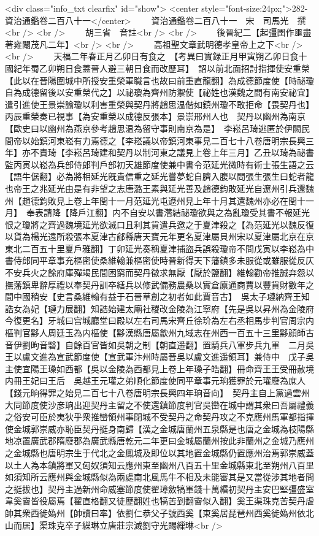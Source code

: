<div class="info_txt clearfix" id="show">
<center style="font-size:24px;">282-資治通鑑卷二百八十一</center>
  　　資治通鑑卷二百八十一　宋　司馬光　撰<br />
<br />
　　胡三省　音註<br />
<br />
　　後晉紀二【起彊圉作噩盡著雍閹茂凡二年】<br />
<br />
　　高祖聖文章武明德孝皇帝上之下<br />
<br />
　　天福二年春正月乙卯日有食之　【考異曰實録正月甲寅朔乙卯日食十國紀年蜀乙卯朔日食蓋晉人避三朝日食而改歷耳】　詔以前北面招討指揮使安重榮【此以在晉陽圍城中所授安重榮軍職言也故曰前重直龍翻】為成德節度使【時祕瓊自為成德留後以安重榮代之】以祕瓊為齊州防禦使【祕姓也漢魏之間有南安祕宜】遣引進使王景崇諭瓊以利害重榮與契丹將趙思温偕如鎮州瓊不敢拒命【畏契丹也】丙辰重榮奏已視事【為安重榮以成德反張本】景崇邢州人也　契丹以幽州為南京【歐史曰以幽州為燕京參考趙思温為留守事則南京為是】　李崧呂琦逃匿於伊闕民間帝以始鎮河東崧有力焉德之【李崧議以帝鎮河東事見二百七十八卷唐明宗長興三年】亦不責琦【李崧呂琦建和契丹以制河東之議見上卷上年三月】乙丑以琦為祕書監丙寅以崧為兵部侍郎判戶部初天雄節度使兼中書令范延光微時有術士張生語之云【語牛倨翻】必為將相延光旣貴信重之延光嘗夢蛇自臍入腹以問張生張生曰蛇者龍也帝王之兆延光由是有非望之志唐潞王素與延光善及趙德鈞敗延光自遼州引兵還魏州【趙德鈞敗見上卷上年閏十一月范延光屯遼州見上年十月其還魏州亦必在閏十一月】　奉表請降【降戶江翻】内不自安以書濳結祕瓊欲與之為亂瓊受其書不報延光恨之瓊將之齊過魏境延光欲滅口且利其貨遣兵邀之于夏津殺之【為范延光以魏反復以貨為楊光遠所殺張本夏津古鄃縣唐天寶元年更名夏津屬貝州宋以夏津屬北京在京東北二百五十里夏戶雅翻】丁卯延光奏稱夏津捕盜兵誤殺瓊帝不問戊寅以李崧為中書侍郎同平章事充樞密使桑維翰兼樞密使時晉新得天下藩鎮多未服從或雖服從反仄不安兵火之餘府庫殫竭民間困窮而契丹徵求無厭【厭於鹽翻】維翰勸帝推誠弃怨以撫藩鎮卑辭厚禮以奉契丹訓卒繕兵以修武備務農桑以實倉廪通商賈以豐貨財數年之間中國稍安【史言桑維翰有益于石晉草創之初者如此賈音古】　吳太子璉納齊王知誥女為妃【璉力展翻】知誥始建太廟社稷改金陵為江寧府【先是吳以昇州為金陵府今復更名】牙城曰宫城廳堂曰殿以左右司馬宋齊丘徐玠為左右丞相馬步判官周宗内樞判官黟人周廷玉為内樞使【黟漢縣唐屬歙州九域志在州西一百五十三里黟顔師古音伊劉昫音䃜】自餘百官皆如吳朝之制【朝直遥翻】置騎兵八軍步兵九軍　二月吳王以盧文進為宣武節度使【宣武軍汴州時屬晉吳以盧文進遥領耳】兼侍中　戊子吳主使宜陽王璪如西都【吳以金陵為西都見上卷上年璪子皓翻】冊命齊王王受冊赦境内冊王妃曰王后　吳越王元瓘之弟順化節度使同平章事元珦獲罪於元瓘廢為庶人【錢元晌得罪之始見二百七十八卷唐明宗長興四年珦音向】　契丹主自上黨過雲州大同節度使沙彦珦出迎契丹主留之不使還鎮節度判官吳巒在城中謂其衆曰吾屬禮義之俗安可臣於夷狄乎衆推巒領州事閉城不受契丹之命契丹攻之不克應州馬軍都指揮使金城郭崇威亦恥臣契丹挺身南歸【漢之金城唐蘭州五泉縣是也唐之金城為枝陽縣地凉置廣武郡隋廢郡為廣武縣唐乾元二年更曰金城屬蘭州按此非蘭州之金城乃應州之金城縣也唐明宗生于代北之金鳳城及即位以其地置金城縣仍置應州治焉郭崇威蓋以土人為本鎮將軍又匈奴須知云應州東至幽州八百五十里金城縣東北至朔州八百里如須知所云應州與金城縣似為兩處南北風馬牛不相及未能審其是又當從涉其地者問之挺拔也】契丹主過新州命威塞節度使翟璋斂犒軍錢十萬緡初契丹主安巴堅彊盛室韋奚霫皆役屬焉【翟直格翻又徒歷翻姓也犒苦到翻霫似入翻】奚王渠珠克苦契丹虐帥其衆西徙媯州【帥讀曰率】依劉仁恭父子號西奚【東奚居琵琶州西奚徙媯州依北山而居】渠珠克卒子繅琳立唐莊宗滅劉守光賜繅琳<br />
